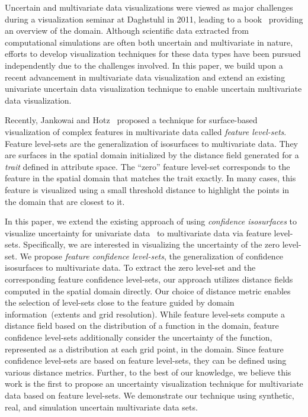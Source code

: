 Uncertain and multivariate data visualizations were viewed as major challenges during a visualization seminar at Daghstuhl in 2011, leading to a book~\cite{hansen2014scientific} providing an overview of the domain. 
%
Although scientific data extracted from computational simulations are often both uncertain and multivariate in nature, efforts to develop visualization techniques for these data types have been pursued independently due to the challenges involved.
%
In this paper, we build upon a recent advancement in multivariate data visualization and extend an existing univariate uncertain data visualization technique to enable uncertain multivariate data visualization.

Recently, Jankowai and Hotz~\cite{jankowai2020feature} proposed a technique for surface-based visualization of complex features in multivariate data called \textit{feature level-sets}. 
%
Feature level-sets are the generalization of isosurfaces to multivariate data.
%
They are surfaces in the spatial domain initialized by the distance field generated for a \textit{trait} defined in attribute space.
%
The ``zero'' feature level-set corresponds to the feature in the spatial domain that matches the trait exactly.
%
In many cases, this feature is visualized using a small threshold distance to highlight the points in the domain that are closest to it. 
%
%

In this paper, we extend the existing approach of using \textit{confidence isosurfaces} to visualize uncertainty for univariate data~\cite{zehner2010visualization} to multivariate data via feature level-sets.
%
Specifically, we are interested in visualizing the uncertainty of the zero level-set.
%
We propose \textit{feature confidence level-sets}, the generalization of confidence isosurfaces to multivariate data.
%
%
To extract the zero level-set and the corresponding feature confidence level-sets, our approach utilizes distance fields computed in the spatial domain directly.
%
Our choice of distance metric enables the selection of level-sets close to the feature guided by domain information~(extents and grid resolution).
%
While feature level-sets compute a distance field based on the distribution of a function in the domain, feature confidence level-sets additionally consider the uncertainty of the function, represented as a distribution at each grid point, in the domain.
%
Since feature confidence level-sets are based on feature level-sets, they can be defined using various distance metrics.  
%
%
Further, to the best of our knowledge, we believe this work is the first to propose an uncertainty visualization technique for multivariate data based on feature level-sets. 
%
We demonstrate our technique using synthetic, real, and simulation uncertain multivariate data sets.

